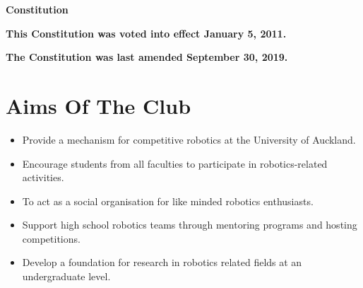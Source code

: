 \documentclass[a4paper]{article}
\begin{document}
	\textbf{
		\underline{}
	}

	\vspace{0.1in}
	
	{
		\LARGE
		\centerline{\textbf{Constitution}}
	}

	\vspace{0.1in}
	
	\textbf{This Constitution was voted into effect January 5, 2011.}
	
	\textbf{The Constitution was last amended September 30, 2019.}
	
	\section*{Aims Of The Club}
	
	\begin{itemize}
		\item Provide a mechanism for competitive robotics at the University of Auckland.
		\item Encourage students from all faculties to participate in robotics-related activities.
		\item To act as a social organisation for like minded robotics enthusiasts.
		\item Support high school robotics teams through mentoring programs and hosting competitions.
		\item Develop a foundation for research in robotics related fields at an undergraduate level.
	\end{itemize}
	
\end{document}
